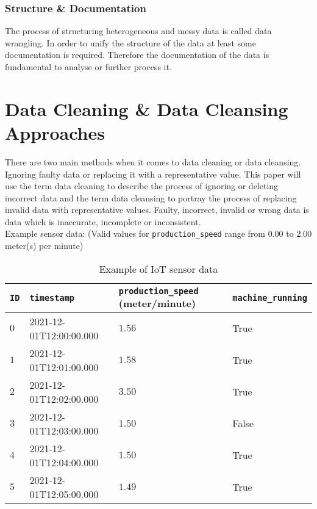 \subsubsection{Structure \& Documentation}
The process of structuring heterogeneous and messy data is called data wrangling. In order to unify the structure of the data at least some documentation is required. Therefore the documentation of the data is fundamental to analyse or further process it. 

\section{Data Cleaning \& Data Cleansing Approaches}\label{section:data-cleaning-cleansing-approaches}
There are two main methods when it comes to data cleaning or data cleansing. Ignoring faulty data or replacing it with a representative value. This paper will use the term data cleaning to describe the process of ignoring or deleting incorrect data and the term data cleansing to portray the process of replacing invalid data with representative values. Faulty, incorrect, invalid or wrong data is data which is inaccurate, incomplete or inconsistent.\\
Example sensor data: (Valid values for \verb|production_speed| range from $0.00$ to $2.00$ meter(s) per minute)
\begin{table}[ht]
\begin{tabular}{|l|l|l|l|}
\hline
\verb|ID| & \verb|timestamp|        & \verb|production_speed| (meter/minute) & \verb|machine_running| \\ \hline
$0$       & 2021-12-01T12:00:00.000 & $1.56$                                 & True                   \\ \hline
$1$       & 2021-12-01T12:01:00.000 & $1.58$                                 & True                   \\ \hline
$2$       & 2021-12-01T12:02:00.000 & $3.50$                                 & True                   \\ \hline
$3$       & 2021-12-01T12:03:00.000 & $1.50$                                 & False                  \\ \hline
$4$       & 2021-12-01T12:04:00.000 & $1.50$                                 & True                   \\ \hline
$5$       & 2021-12-01T12:05:00.000 & $1.49$                                 & True                   \\ \hline
\end{tabular}
\caption{Example of IoT sensor data}
\label{table:example-iot-data}
\end{table}
